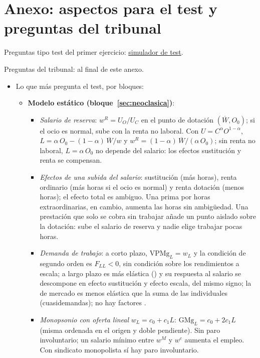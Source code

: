 \documentclass[11pt]{article}
\begin{document}
\section{Anexo: aspectos para el test y preguntas del tribunal}\label{anexo:test}

\begin{anotaciones}
Preguntas tipo test del primer ejercicio: \href{https://www.victorgutierrezmarcos.es/oposicion/temario/primer-ejercicio/test/simulador.html?tema=3.A.25}{simulador de test}.

Preguntas del tribunal: al final de este anexo.
\end{anotaciones}

\begin{itemize}
\item Lo que más pregunta el test, por bloques:
  \begin{itemize}
  \item \textbf{Modelo estático (bloque~\ref{sec:neoclasica})}:
    \begin{itemize}
    \item \emph{Salario de reserva}: $w^R=U_O/U_C$ en el punto de dotación $(\overline{W},O_0)$; si el ocio es normal, sube con la renta no laboral. Con $U=C^{\alpha}O^{1-\alpha}$, $L=\alpha\,O_0-(1-\alpha)\,\overline{W}/w$ y $w^R=(1-\alpha)\,\overline{W}/(\alpha\,O_0)$; sin renta no laboral, $L=\alpha\,O_0$ no depende del salario: los efectos sustitución y renta se compensan.
    \item \emph{Efectos de una subida del salario}: sustitución (más horas), renta ordinario (más horas si el ocio es normal) y renta dotación (menos horas); el efecto total es ambiguo. Una prima por horas extraordinarias, en cambio, aumenta las horas sin ambigüedad. Una prestación que solo se cobra sin trabajar añade un punto aislado sobre la dotación: sube el salario de reserva y nadie elige trabajar pocas horas.
    \item \emph{Demanda de trabajo}: a corto plazo, $\mathrm{VPMg}_L=w_L$ y la condición de segundo orden es $F_{LL}<0$, sin condición sobre los rendimientos a escala; a largo plazo es más elástica () y su respuesta al salario se descompone en efecto sustitución y efecto escala, del mismo signo; la de mercado es menos elástica que la suma de las individuales (cuasidemandas); no hay factores .
    \item \emph{Monopsonio con oferta lineal} $w_L=c_0+c_1L$: $\mathrm{GMg}_L=c_0+2c_1L$ (misma ordenada en el origen y doble pendiente). Sin paro involuntario; un salario mínimo entre $w^M$ y $w^c$ aumenta el empleo. Con sindicato monopolista sí hay paro involuntario.

\end{itemize}
\end{itemize}
\end{itemize}
\end{document}

